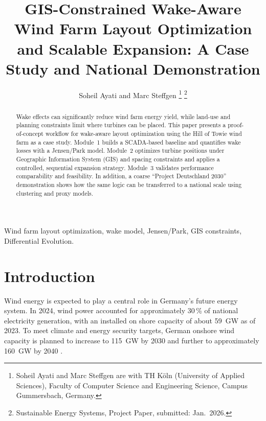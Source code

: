 \documentclass[lettersize,journal]{IEEEtran}
\begin{document}
\title{GIS-Constrained Wake-Aware Wind Farm Layout Optimization and Scalable Expansion: A Case Study and National Demonstration}

\author{Soheil Ayati and Marc Steffgen%
\thanks{Soheil Ayati and Marc Steffgen are with TH Köln (University of Applied Sciences),  Faculty of Computer Science and Engineering Science, Campus Gummersbach, Germany.}%
\thanks{Sustainable Energy Systems, Project Paper, submitted: Jan.~2026.}%
}

\maketitle

\begin{abstract}
Wake effects can significantly reduce wind farm energy yield, while land-use and planning constraints limit where turbines can be placed. This paper presents a proof-of-concept workflow for wake-aware layout optimization using the Hill of Towie wind farm as a case study. Module~1 builds a SCADA-based baseline and quantifies wake losses with a Jensen/Park model. Module~2 optimizes turbine positions under Geographic Information System (GIS) and spacing constraints and applies a controlled, sequential expansion strategy. Module~3 validates performance comparability and feasibility. In addition, a coarse ``Project Deutschland 2030'' demonstration shows how the same logic can be transferred to a national scale using clustering and proxy models.
\end{abstract}


\begin{IEEEkeywords}
Wind farm layout optimization, wake model, Jensen/Park, GIS constraints, Differential Evolution.
\end{IEEEkeywords}



\section{Introduction}

Wind energy is expected to play a central role in Germany’s future energy system. In 2024, wind power accounted for approximately 30\,\% of national electricity generation, with an installed on shore capacity of about 59~GW as of 2023. To meet climate and energy security targets, German onshore wind capacity is planned to increase to 115~GW by 2030 and further to approximately 160~GW by 2040 \cite{bundestag2023wind}.
\end{document}
